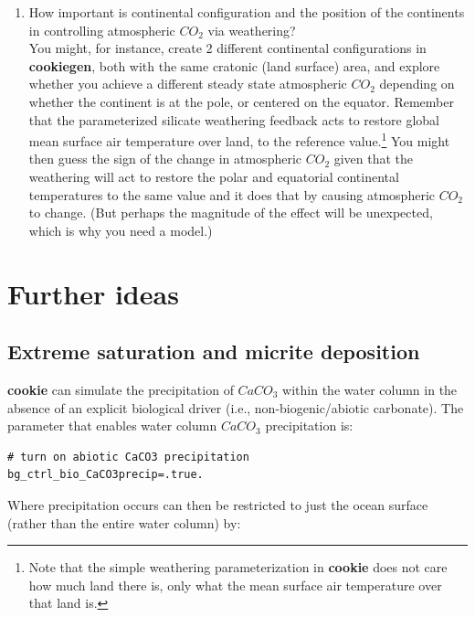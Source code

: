 \begin{enumerate}[noitemsep]
\vspace{1mm}
\item How important is continental configuration and the position of the continents in controlling atmospheric \(CO_{2}\) via weathering?
\\You might, for instance, create 2 different continental configurations in \textbf{cookiegen}, both with the same cratonic (land surface) area, and explore whether you achieve a different steady state atmospheric \(CO_{2}\) depending on whether the continent is at the pole, or centered on the equator. Remember that the parameterized silicate weathering feedback acts to restore global mean surface air temperature over land, to the reference value.\footnote{Note that the simple weathering parameterization in \textbf{cookie} does not care how much land there is, only what the mean surface air temperature over that land is.} You might then guess the sign of the change in atmospheric \(CO_{2}\) given that the weathering will act to restore the polar and equatorial continental temperatures to the same value and it does that by causing atmospheric \(CO_{2}\) to change. (But perhaps the magnitude of the effect will be unexpected, which is why you need a model.)

\end{enumerate}

\newpage

\section{Further ideas}


\subsection{Extreme saturation and micrite deposition}

\textbf{cookie} can simulate the precipitation of $CaCO_{3}$ within the water column in the absence of an explicit biological driver (i.e., non-biogenic/abiotic carbonate). The parameter that enables water column $CaCO_{3}$ precipitation is:

\vspace{-2mm}\small\begin{verbatim}
# turn on abiotic CaCO3 precipitation
bg_ctrl_bio_CaCO3precip=.true.
\end{verbatim}\normalsize\vspace{-2mm}
Where precipitation occurs can then be restricted to just the ocean surface (rather than the entire water column) by:

